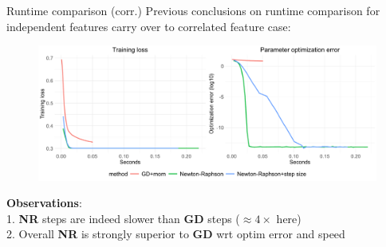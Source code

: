 \documentclass[11pt,compress,t,notes=noshow, xcolor=table]{beamer}
\begin{document}
\begin{vbframe}{Runtime comparison (corr.)}
\vspace{-0.2cm}
Previous conclusions on runtime comparison for independent features carry over to correlated feature case:
\bigskip

\begin{figure}
            \includegraphics[width=1.0\textwidth]{slides/05-multivariate-second-order/figure_man/simu-newton/NR_GD_runtime_comparison_corr.pdf} \\
\end{figure} 
\vspace{-0.3cm}
\textbf{Observations}:\\ 1. \textbf{NR} steps are indeed slower than \textbf{GD} steps ($\approx 4\times$ here)\\
2. Overall \textbf{NR} is strongly superior to \textbf{GD} wrt optim error and speed\\
\end{vbframe}

\endlecture
\end{document}
